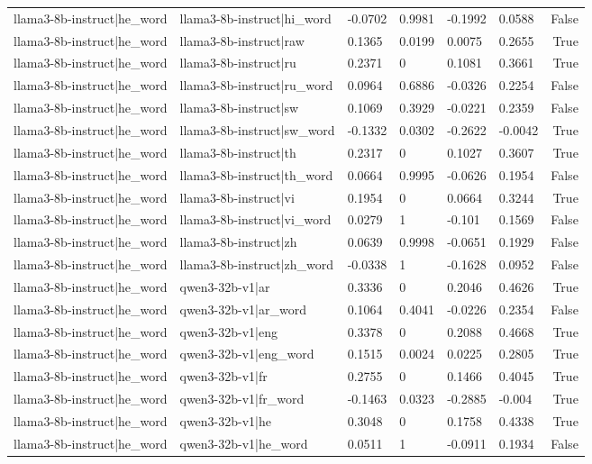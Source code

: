 \begin{table}
\begin{tabular}{llllllr}
llama3-8b-instruct|he_word & llama3-8b-instruct|hi_word & -0.0702 & 0.9981 & -0.1992 & 0.0588 & False \\
llama3-8b-instruct|he_word & llama3-8b-instruct|raw & 0.1365 & 0.0199 & 0.0075 & 0.2655 & True \\
llama3-8b-instruct|he_word & llama3-8b-instruct|ru & 0.2371 & 0 & 0.1081 & 0.3661 & True \\
llama3-8b-instruct|he_word & llama3-8b-instruct|ru_word & 0.0964 & 0.6886 & -0.0326 & 0.2254 & False \\
llama3-8b-instruct|he_word & llama3-8b-instruct|sw & 0.1069 & 0.3929 & -0.0221 & 0.2359 & False \\
llama3-8b-instruct|he_word & llama3-8b-instruct|sw_word & -0.1332 & 0.0302 & -0.2622 & -0.0042 & True \\
llama3-8b-instruct|he_word & llama3-8b-instruct|th & 0.2317 & 0 & 0.1027 & 0.3607 & True \\
llama3-8b-instruct|he_word & llama3-8b-instruct|th_word & 0.0664 & 0.9995 & -0.0626 & 0.1954 & False \\
llama3-8b-instruct|he_word & llama3-8b-instruct|vi & 0.1954 & 0 & 0.0664 & 0.3244 & True \\
llama3-8b-instruct|he_word & llama3-8b-instruct|vi_word & 0.0279 & 1 & -0.101 & 0.1569 & False \\
llama3-8b-instruct|he_word & llama3-8b-instruct|zh & 0.0639 & 0.9998 & -0.0651 & 0.1929 & False \\
llama3-8b-instruct|he_word & llama3-8b-instruct|zh_word & -0.0338 & 1 & -0.1628 & 0.0952 & False \\
llama3-8b-instruct|he_word & qwen3-32b-v1|ar & 0.3336 & 0 & 0.2046 & 0.4626 & True \\
llama3-8b-instruct|he_word & qwen3-32b-v1|ar_word & 0.1064 & 0.4041 & -0.0226 & 0.2354 & False \\
llama3-8b-instruct|he_word & qwen3-32b-v1|eng & 0.3378 & 0 & 0.2088 & 0.4668 & True \\
llama3-8b-instruct|he_word & qwen3-32b-v1|eng_word & 0.1515 & 0.0024 & 0.0225 & 0.2805 & True \\
llama3-8b-instruct|he_word & qwen3-32b-v1|fr & 0.2755 & 0 & 0.1466 & 0.4045 & True \\
llama3-8b-instruct|he_word & qwen3-32b-v1|fr_word & -0.1463 & 0.0323 & -0.2885 & -0.004 & True \\
llama3-8b-instruct|he_word & qwen3-32b-v1|he & 0.3048 & 0 & 0.1758 & 0.4338 & True \\
llama3-8b-instruct|he_word & qwen3-32b-v1|he_word & 0.0511 & 1 & -0.0911 & 0.1934 & False \\

\end{tabular}
\end{table}
